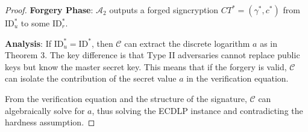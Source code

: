 \documentclass[10pt]{article}
\newtheorem{proof}{Proof}
\begin{document}
\begin{proof}
\textbf{Forgery Phase}:
$\mathcal{A}_2$ outputs a forged signcryption $CT^* = (\gamma^*, c^*)$ from $\text{ID}_u^*$ to some $\text{ID}_r^*$.

\textbf{Analysis}:
If $\text{ID}_u^* = \text{ID}^*$, then $\mathcal{C}$ can extract the discrete logarithm $a$ as in Theorem 3. The key difference is that Type II adversaries cannot replace public keys but know the master secret key. This means that if the forgery is valid, $\mathcal{C}$ can isolate the contribution of the secret value $a$ in the verification equation.

From the verification equation and the structure of the signature, $\mathcal{C}$ can algebraically solve for $a$, thus solving the ECDLP instance and contradicting the hardness assumption.
\end{proof}
\end{document}
